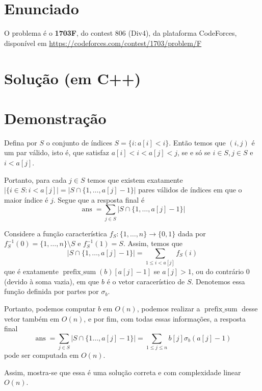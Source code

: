\documentclass{article}
\begin{document}
\section{Enunciado}
O problema é o \textbf{1703F}, do contest 806 (Div4), da plataforma CodeForces, disponível em \url{https://codeforces.com/contest/1703/problem/F}

\section{Solução (em C++)}

\section{Demonstração}
Defina por \(S\) o conjunto de índices \(S = \{i: a[i] < i\}\). Então temos que \((i, j)\) é um par válido, isto é, que satisfaz \(a[i] < i < a[j] < j\), se e só se \(i \in S, j \in S\) e \(i < a[j]\).

Portanto, para cada \(j \in S\) temos que existem exatamente \(|\{i \in S: i < a[j]| = |S \cap \{1, \dotsc, a[j] - 1\}|\) pares válidos de índices em que o maior índice é \(j\). Segue que a resposta final é 
\[\operatorname{ans} = \sum_{j \in S}|S \cap \{1, \dotsc, a[j] - 1\}|\]

Considere a função característica \(f_S: \{1, \dotsc, n\} \to \{0,1\}\) dada por \(f_S^{-1}(0) = \{1, \dotsc, n\} \setminus S\) e \(f_S^{-1}(1) = S\). Assim, temos que
\[|S \cap \{1, \dotsc, a[j] - 1\}| = \sum_{1 \leq i < a[j]}f_S(i)\]
que é exatamente \(\operatorname{prefix\_sum}(b)[a[j] - 1]\) se \(a[j] > 1\), ou do contrário \(0\) (devido à soma vazia), em que \(b\) é o vetor caracerístico de \(S\). Denotemos essa função definida por partes por \(\sigma_b\).  

Portanto, podemos computar \(b\) em \(O(n)\), podemos realizar a \(\operatorname{prefix\_sum}\) desse vetor também em \(O(n)\), e por fim, com todas essas informações, a resposta final 
\[\operatorname{ans} = \sum_{j \in S}|S \cap \{1 \dotsc, a[j] - 1\}| = \sum_{1 \leq j \leq n}b[j]\sigma_b(a[j] - 1)\]
pode ser computada em \(O(n)\).

Assim, mostra-se que essa é uma solução correta e com complexidade linear \(O(n)\).
\end{document}
